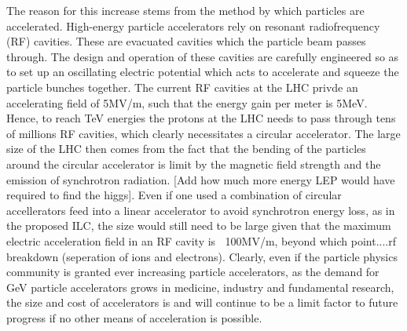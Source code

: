 \documentclass[%
 onecolumn,notitlepage,
 amsmath,amssymb,
 aps,
 longbibliography
]{revtex4-1}
\begin{document}
\indent The reason for this increase stems from the method by which particles are accelerated. High-energy particle accelerators rely on resonant radiofrequency (RF) cavities. These are evacuated cavities which the particle beam passes through. The design and operation of these cavities are carefully engineered so as to set up an oscillating electric potential which acts to accelerate and squeeze the particle bunches together. The current RF cavities at the LHC privde an accelerating field of 5MV/m, such that the energy gain per meter is 5MeV. Hence, to reach TeV energies the protons at the LHC needs to pass through tens of millions RF cavities, which clearly necessitates a circular accelerator. The large size of the LHC then comes from the fact that the bending of the particles around the circular accelerator is limit by the magnetic field strength and the emission of synchrotron radiation.  [Add how much more energy LEP would have required to find the higgs]. Even if one used a combination of circular accellerators feed into a linear accelerator to avoid synchrotron energy loss, as in the proposed ILC, the size would still need to be large given that the maximum electric acceleration field in an RF cavity is $~$ 100MV/m, beyond which point....rf breakdown (seperation of ions and electrons). Clearly, even if the particle physics community is granted ever increasing particle accelerators, as the demand for GeV particle accelerators grows in medicine, industry and fundamental research, the size and cost of accelerators is and will continue to be a limit factor to future progress if no other means of acceleration is possible.\vspace{-8pt}
\end{document}
